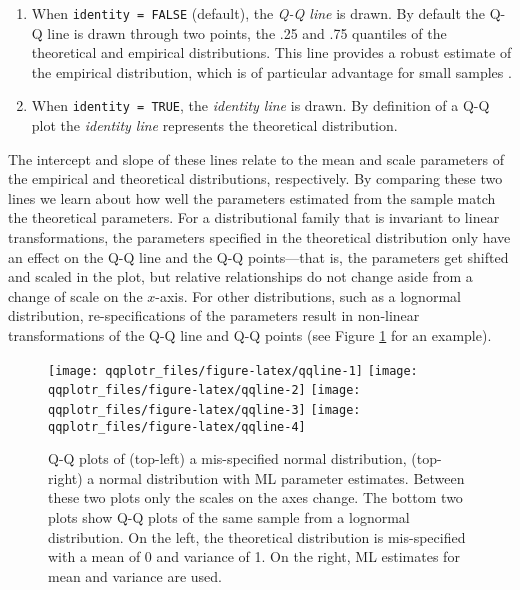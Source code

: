 \begin{enumerate}
\def\labelenumi{\alph{enumi})}
\tightlist
\item
  When \texttt{identity\ =\ FALSE} (default), the \emph{Q-Q line} is
  drawn. By default the Q-Q line is drawn through two points, the .25
  and .75 quantiles of the theoretical and empirical distributions. This
  line provides a robust estimate of the empirical distribution, which
  is of particular advantage for small samples \citep{Loy2016-fg}.
\item
  When \texttt{identity\ =\ TRUE}, the \emph{identity line} is drawn. By
  definition of a Q-Q plot the \emph{identity line} represents the
  theoretical distribution.
\end{enumerate}

The intercept and slope of these lines relate to the mean and scale
parameters of the empirical and theoretical distributions, respectively.
By comparing these two lines we learn about how well the parameters
estimated from the sample match the theoretical parameters. For a
distributional family that is invariant to linear transformations, the
parameters specified in the theoretical distribution only have an effect
on the Q-Q line and the Q-Q points---that is, the parameters get shifted
and scaled in the plot, but relative relationships do not change aside
from a change of scale on the \(x\)-axis. For other distributions, such
as a lognormal distribution, re-specifications of the parameters result
in non-linear transformations of the Q-Q line and Q-Q points (see Figure
\ref{fig:qqline} for an example).

\begin{Schunk}
\begin{figure}

{\centering \texttt{[image: qqplotr\_files/figure-latex/qqline-1]} \texttt{[image: qqplotr\_files/figure-latex/qqline-2]} \texttt{[image: qqplotr\_files/figure-latex/qqline-3]} \texttt{[image: qqplotr\_files/figure-latex/qqline-4]} 

}

\caption[Q-Q plots of (top-left) a mis-specified normal distribution, (top-right) a normal distribution with ML parameter estimates]{Q-Q plots of (top-left) a mis-specified normal distribution, (top-right) a normal distribution with ML parameter estimates. Between these two plots only the scales on the axes change. The bottom two plots show Q-Q plots of the same sample from a lognormal distribution. On the left, the theoretical distribution is mis-specified with a mean of 0 and variance of 1. On the right, ML estimates for mean and variance are used.}\label{fig:qqline}
\end{figure}
\end{Schunk}

